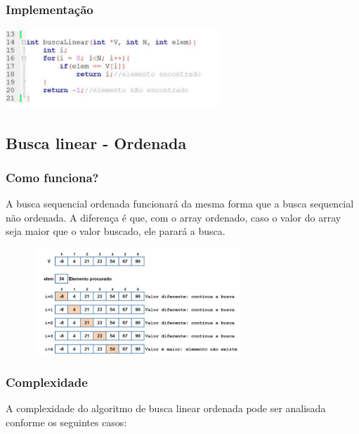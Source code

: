 \documentclass{report}
\begin{document}
	\subsubsection{Implementação}
	
	\begin{center}
		
		\includegraphics[width=8cm,height=3cm,keepaspectratio=false]{imagens/blinear.png}
		
	\end{center}
	
	\subsection{Busca linear - Ordenada}
	\subsubsection{Como funciona?}
	A busca sequencial ordenada funcionará da mesma forma que a busca sequencial não ordenada. A diferença é que, com o array ordenado, caso o valor do array seja maior que o valor buscado, ele parará a busca.
	
	\begin{center}
	
	\includegraphics[width=10cm,height=4cm,keepaspectratio=false]{imagens/blinearordenada.png}
	
	\end{center}
	
	\subsubsection{Complexidade}
	
	A complexidade do algoritmo de busca linear ordenada pode ser analisada conforme os seguintes casos:
	
\end{document}
